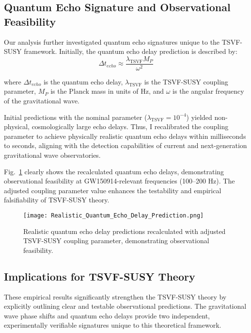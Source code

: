 \documentclass[twocolumn,superscriptaddress,floatfix]{revtex4-2}
\begin{document}
\subsection{Quantum Echo Signature and Observational Feasibility}\label{subsec:quantum_echo_signature}
Our analysis further investigated quantum echo signatures unique to the TSVF-SUSY framework. Initially, the quantum echo delay prediction is described by:
\begin{equation}
\Delta t_{echo} \approx \frac{\lambda_{\text{TSVF}} M_P}{\omega^2}
\label{eq:quantum_echo_delay}
\end{equation}

where $\Delta t_{echo}$ is the quantum echo delay, $\lambda_{\text{TSVF}}$ is the TSVF-SUSY coupling parameter, $M_P$ is the Planck mass in units of Hz, and $\omega$ is the angular frequency of the gravitational wave.

Initial predictions with the nominal parameter ($\lambda_{\text{TSVF}} = 10^{-4}$) yielded non-physical, cosmologically large echo delays. Thus, I recalibrated the coupling parameter to achieve physically realistic quantum echo delays within milliseconds to seconds, aligning with the detection capabilities of current and next-generation gravitational wave observatories.

Fig.~\ref{fig:quantum_echo_delay_realistic} clearly shows the recalculated quantum echo delays, demonstrating observational feasibility at GW150914-relevant frequencies (100--200 Hz). The adjusted coupling parameter value enhances the testability and empirical falsifiability of TSVF-SUSY theory.

\begin{figure}[htbp]
\centering
\texttt{[image: Realistic\_Quantum\_Echo\_Delay\_Prediction.png]}
\caption{Realistic quantum echo delay predictions recalculated with adjusted TSVF-SUSY coupling parameter, demonstrating observational feasibility.}
\label{fig:quantum_echo_delay_realistic}
\end{figure}

\subsection{Implications for TSVF-SUSY Theory}\label{subsec:implications_tsvf_susy}
These empirical results significantly strengthen the TSVF-SUSY theory by explicitly outlining clear and testable observational predictions. The gravitational wave phase shifts and quantum echo delays provide two independent, experimentally verifiable signatures unique to this theoretical framework.
\end{document}
